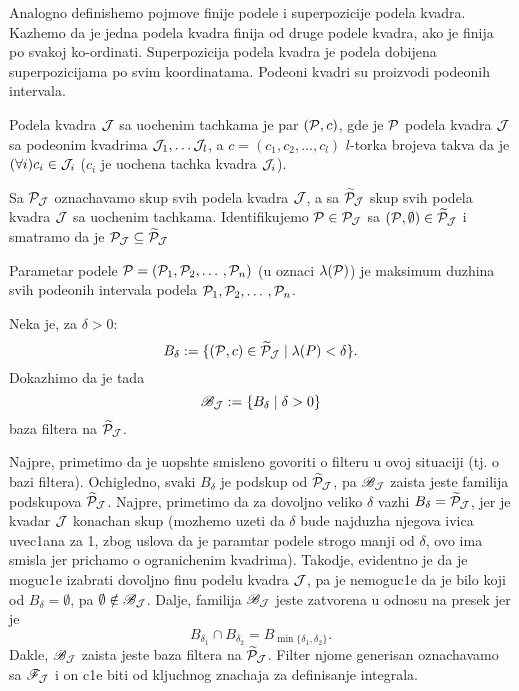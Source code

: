 \documentclass[../main.tex]{subfiles}
\begin{document}
    Analogno definishemo pojmove finije podele i superpozicije podela kvadra. Kazhemo da je jedna podela kvadra finija od druge podele kvadra, ako je \zn finija po svakoj ko-ordinati\zng. 
    Superpozicija podela kvadra je podela dobijena superpozicijama \zn po svim koordinatama\zng. Podeoni kvadri su proizvodi podeonih intervala.

    \begin{de}
    	Podela kvadra $\mathcal{J}$ sa uochenim tachkama je par $(\mathcal{P},c)$, gde je $\mathcal{P}$ podela kvadra $\mathcal{J}$ sa podeonim kvadrima $\mathcal{J}_1,\dotso\mathcal{J}_l$,
	a $c=(c_1,c_2,\dotso,c_l)$ $l$-torka brojeva takva da je $(\forall i)c_i\in\mathcal{J}_i$ ($c_i$ je uochena tachka kvadra $\mathcal{J}_i$).
    \end{de}

    Sa $\mathcal{P}_\mathcal{J}$ oznachavamo skup svih podela kvadra $\mathcal{J}$, a sa $\widetilde{\mathcal{P}}_\mathcal{J}$ skup svih podela kvadra $\mathcal{J}$ sa uochenim tachkama.
    Identifikujemo $\mathcal{P}\in \mathcal{P}_\mathcal{J}$ sa $(\mathcal{P},\emptyset)\in \widetilde{\mathcal{P}}_\mathcal{J}$ i smatramo da je $\mathcal{P}_\mathcal{J}\subseteq\widetilde{\mathcal{P}}_\mathcal{J}$
    
    \begin{de}
    	Parametar podele $\mathcal{P}=(\mathcal{P}_1,\mathcal{P}_2,\dotso, \mathcal{P}_n)$ (u oznaci $\lambda(\mathcal{P})$) je maksimum duzhina svih podeonih intervala podela $\mathcal{P}_1,\mathcal{P}_2,\dotso, \mathcal{P}_n$.
    \end{de}

    Neka je, za $\delta>0$:
    \[B_\delta := \{(\mathcal{P},c)\in \widetilde{\mathcal{P}}_\mathcal{J}\mid \lambda(P)<\delta\}.\]
    Dokazhimo da je tada
    \[\mathscr{B}_\mathcal{J}:=\{B_\delta \mid \delta > 0\}\]
    baza filtera na $\widetilde{\mathcal{P}}_\mathcal{J}$. 
    \label{filterpodela}

    Najpre, primetimo da je uopshte smisleno govoriti o filteru u ovoj situaciji (tj. o bazi filtera). Ochigledno, svaki $B_\delta$ je podskup od $\widetilde{\mathcal{P}}_{\mathcal{J}}$,
    pa $\mathscr{B}_{\mathcal{J}}$ zaista jeste familija podskupova $\widetilde{\mathcal{P}}_{\mathcal{J}}$. Najpre, primetimo da za dovoljno veliko $\delta$ vazhi $B_\delta=\widetilde{\mathcal{P}}_{\mathcal{J}}$, jer je 
    kvadar $\mathcal{J}$ konachan skup (mozhemo uzeti da $\delta$ bude najduzha njegova ivica uvec1ana za 1, zbog uslova da je paramtar podele strogo manji od $\delta$, ovo ima smisla
    jer prichamo o ogranichenim kvadrima). Takodje, evidentno je da je moguc1e izabrati \zn dovoljno finu podelu kvadra $\mathcal{J}$\zng, pa je nemoguc1e da je bilo koji od
    $B_\delta = \emptyset$, pa $\emptyset \notin \mathscr{B}_{\mathcal{J}}$. Dalje, familija $\mathscr{B}_{\mathcal{J}}$ jeste zatvorena u odnosu na presek jer je 
    \[B_{\delta_1}\cap B_{\delta_2}=B_{\min\{\delta_1,\delta_2\}}.\]
    Dakle, $\mathscr{B}_{\mathcal{J}}$  zaista jeste baza filtera na $\widetilde{\mathcal{P}}_\mathcal{J}$. Filter njome generisan oznachavamo sa $\mathscr{F}_{\mathcal{J}}$ i on c1e biti od kljuchnog znachaja za 
    definisanje integrala.
\end{document}
